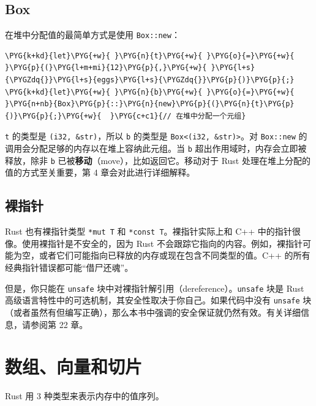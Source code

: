 \subsection{Box}

在堆中分配值的最简单方式是使用 \texttt{Box::new}：

\begin{Verbatim}[commandchars=\\\{\},breaklines=true,breakanywhere=true,fontsize=\codefont,xleftmargin=17bp]
\PYG{k+kd}{let}\PYG{+w}{ }\PYG{n}{t}\PYG{+w}{ }\PYG{o}{=}\PYG{+w}{ }\PYG{p}{(}\PYG{l+m+mi}{12}\PYG{p}{,}\PYG{+w}{ }\PYG{l+s}{\PYGZdq{}}\PYG{l+s}{eggs}\PYG{l+s}{\PYGZdq{}}\PYG{p}{)}\PYG{p}{;}
\PYG{k+kd}{let}\PYG{+w}{ }\PYG{n}{b}\PYG{+w}{ }\PYG{o}{=}\PYG{+w}{ }\PYG{n+nb}{Box}\PYG{p}{::}\PYG{n}{new}\PYG{p}{(}\PYG{n}{t}\PYG{p}{)}\PYG{p}{;}\PYG{+w}{  }\PYG{c+c1}{// 在堆中分配一个元组}
\end{Verbatim}

\texttt{t} 的类型是 \texttt{(i32, \&str)}，所以 \texttt{b} 的类型是 \texttt{Box<(i32, \&str)>}。对 \texttt{Box::new} 的调用会分配足够的内存以在堆上容纳此元组。当 \texttt{b} 超出作用域时，内存会立即被释放，除非 \texttt{b} 已被\textbf{移动}（move），比如返回它。移动对于 Rust 处理在堆上分配的值的方式至关重要，第 4 章会对此进行详细解释。

\subsection{裸指针}

Rust 也有裸指针类型 \texttt{*mut T} 和 \texttt{*const T}。裸指针实际上和 C++ 中的指针很像。使用裸指针是不安全的，因为 Rust 不会跟踪它指向的内容。例如，裸指针可能为空，或者它们可能指向已释放的内存或现在包含不同类型的值。C++ 的所有经典指针错误都可能“借尸还魂”。

但是，你只能在 \texttt{unsafe} 块中对裸指针解引用（dereference）。\texttt{unsafe} 块是 Rust 高级语言特性中的可选机制，其安全性取决于你自己。如果代码中没有 \texttt{unsafe} 块（或者虽然有但编写正确），那么本书中强调的安全保证就仍然有效。有关详细信息，请参阅第 22 章。

\section{数组、向量和切片}

Rust 用 3 种类型来表示内存中的值序列。

